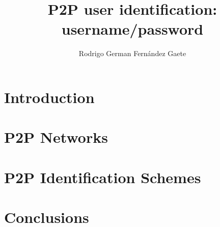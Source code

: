 \documentclass[letter, 12pt]{report}
\title{P2P user identification: username/password}
\author{Rodrigo German Fernández Gaete}
\begin{document}


\beforepreface



%


\newpage

\afterpreface


\renewcommand{\chaptername}{Chapter}
\setcounter{secnumdepth}{3}
\setcounter{tocdepth}{3}

\chapter{Introduction}
\label{sec:intro}



\chapter{P2P Networks}

\chapter{P2P Identification Schemes}
\label{sec:system}



%
%






\chapter{Conclusions}
%

\appendix

\renewcommand{\bibname}{Bibliography}


\end{document}
